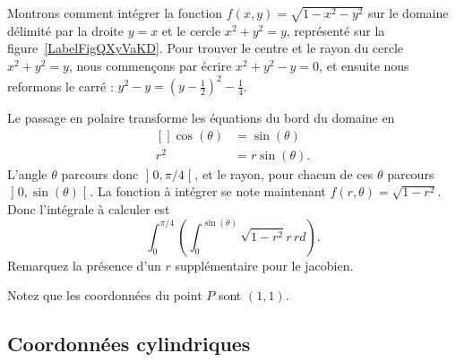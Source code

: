 \begin{example}
    Montrons comment intégrer la fonction $f(x,y)=\sqrt{1-x^2-y^2}$ sur le domaine délimité par la droite $y=x$ et le cercle $x^2+y^2=y$, représenté sur la figure~\ref{LabelFigQXyVaKD}. Pour trouver le centre et le rayon du cercle $x^2+y^2=y$, nous commençons par écrire $x^2+y^2-y=0$, et ensuite nous reformons le carré : $y^2-y=(y-\frac{ 1 }{2})^2-\frac{1}{ 4 }$.
    \newcommand{\CaptionFigQXyVaKD}{Passage en polaire pour intégrer sur un morceau de cercle.}


    Le passage en polaire transforme les équations du bord du domaine en
    \begin{equation}
        \begin{aligned}[]
            \cos(\theta)&=\sin(\theta)\\
            r^2&=r\sin(\theta).
        \end{aligned}
    \end{equation}
    L'angle $\theta$ parcours donc $\mathopen] 0 , \pi/4 \mathclose[$, et le rayon, pour chacun de ces $\theta$ parcours $\mathopen] 0 , \sin(\theta) \mathclose[$. La fonction à intégrer se note maintenant $f(r,\theta)=\sqrt{1-r^2}$. Donc l'intégrale à calculer est
    \begin{equation}		\label{PgRapIntMultFubiniBoutCercle}
        \int_{0}^{\pi/4}\left( \int_0^{\sin(\theta)}\sqrt{1-r^2}r\,rd \right).
    \end{equation}
    Remarquez la présence d'un $r$ supplémentaire pour le jacobien.

    Notez que les coordonnées du point $P$ sont $(1,1)$.
\end{example}

\subsection{Coordonnées cylindriques}

